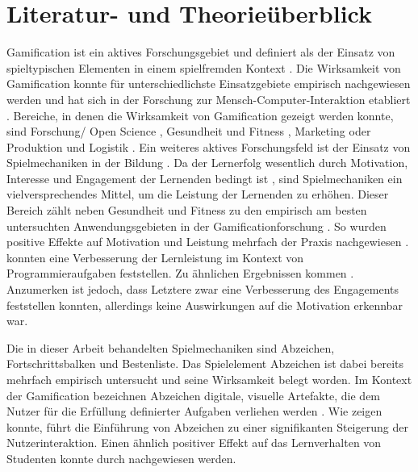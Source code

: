 \documentclass[
    a4paper,
    doc,
    12pt,
    natbib,
]{apa6}
\begin{document}
\section{Literatur- und Theorieüberblick}
Gamification ist ein aktives Forschungsgebiet und definiert als der Einsatz von spieltypischen Elementen in einem spielfremden Kontext \citep{deterding_game_2011}. 
Die Wirksamkeit von Gamification konnte für unterschiedlichste Einsatzgebiete empirisch nachgewiesen werden \citep{koivisto_rise_2019} und hat sich in der Forschung zur Mensch-Computer-Interaktion etabliert \citep{huotari_defining_2012}. 
Bereiche, in denen die Wirksamkeit von Gamification gezeigt werden konnte, sind Forschung/ Open Science \citep{brauer_erhohung_2019,kidwell_badges_2016}, Gesundheit und Fitness \citep{johnson_gamification_2016}, Marketing \citep{huotari_defining_2012} oder Produktion und Logistik \citep{warmelink_gamification_2018}.
Ein weiteres aktives Forschungsfeld ist der Einsatz von Spielmechaniken in der Bildung \citep{ibanez_gamification_2014,landers_enhancing_2017}. Da der Lernerfolg wesentlich durch Motivation, Interesse und Engagement der Lernenden bedingt ist \citep{astin_student_1984}, sind Spielmechaniken ein vielversprechendes Mittel, um die Leistung der Lernenden zu erhöhen.
Dieser Bereich zählt neben Gesundheit und Fitness zu den empirisch am besten untersuchten Anwendungsgebieten in der Gamificationforschung \citep{koivisto_rise_2019}.
So wurden positive Effekte auf Motivation und Leistung mehrfach der Praxis nachgewiesen \citep{ibanez_gamification_2014,hamzah_influence_2015,strmecki_gamification_2015}. \cite{layth_khaleel_empirical_2019} konnten eine Verbesserung der Lernleistung im Kontext von Programmieraufgaben feststellen. Zu ähnlichen Ergebnissen kommen \cite{ortiz_gamification_2017}. Anzumerken ist jedoch, dass Letztere zwar eine Verbesserung des Engagements feststellen konnten, allerdings keine Auswirkungen auf die Motivation erkennbar war.

Die in dieser Arbeit behandelten Spielmechaniken sind Abzeichen, Fortschrittsbalken und Bestenliste.
Das Spielelement Abzeichen ist dabei bereits mehrfach empirisch untersucht und seine Wirksamkeit belegt worden. Im Kontext der Gamification bezeichnen Abzeichen digitale, visuelle Artefakte, die dem Nutzer für die Erfüllung definierter Aufgaben verliehen werden \citep{antin_badges_2011}. Wie \cite{hamari_badges_2017} zeigen konnte, führt die Einführung von Abzeichen zu einer signifikanten Steigerung der Nutzerinteraktion.
Einen ähnlich positiver Effekt auf das Lernverhalten von Studenten konnte durch \cite{hamzah_influence_2015} nachgewiesen werden.
\end{document}
